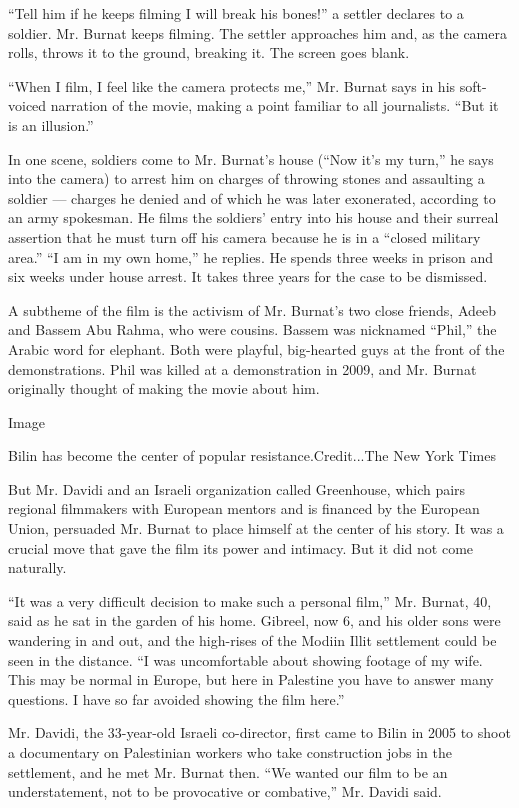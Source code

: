 ``Tell him if he keeps filming I will break his bones!'' a settler
declares to a soldier. Mr. Burnat keeps filming. The settler approaches
him and, as the camera rolls, throws it to the ground, breaking it. The
screen goes blank.

``When I film, I feel like the camera protects me,'' Mr. Burnat says in
his soft-voiced narration of the movie, making a point familiar to all
journalists. ``But it is an illusion.''

In one scene, soldiers come to Mr. Burnat's house (``Now it's my turn,''
he says into the camera) to arrest him on charges of throwing stones and
assaulting a soldier --- charges he denied and of which he was later
exonerated, according to an army spokesman. He films the soldiers' entry
into his house and their surreal assertion that he must turn off his
camera because he is in a ``closed military area.'' ``I am in my own
home,'' he replies. He spends three weeks in prison and six weeks under
house arrest. It takes three years for the case to be dismissed.

A subtheme of the film is the activism of Mr. Burnat's two close
friends, Adeeb and Bassem Abu Rahma, who were cousins. Bassem was
nicknamed ``Phil,'' the Arabic word for elephant. Both were playful,
big-hearted guys at the front of the demonstrations. Phil was killed at
a demonstration in 2009, and Mr. Burnat originally thought of making the
movie about him.

Image

Bilin has become the center of popular resistance.Credit...The New York
Times

But Mr. Davidi and an Israeli organization called Greenhouse, which
pairs regional filmmakers with European mentors and is financed by the
European Union, persuaded Mr. Burnat to place himself at the center of
his story. It was a crucial move that gave the film its power and
intimacy. But it did not come naturally.

``It was a very difficult decision to make such a personal film,'' Mr.
Burnat, 40, said as he sat in the garden of his home. Gibreel, now 6,
and his older sons were wandering in and out, and the high-rises of the
Modiin Illit settlement could be seen in the distance. ``I was
uncomfortable about showing footage of my wife. This may be normal in
Europe, but here in Palestine you have to answer many questions. I have
so far avoided showing the film here.''

Mr. Davidi, the 33-year-old Israeli co-director, first came to Bilin in
2005 to shoot a documentary on Palestinian workers who take construction
jobs in the settlement, and he met Mr. Burnat then. ``We wanted our film
to be an understatement, not to be provocative or combative,'' Mr.
Davidi said.


